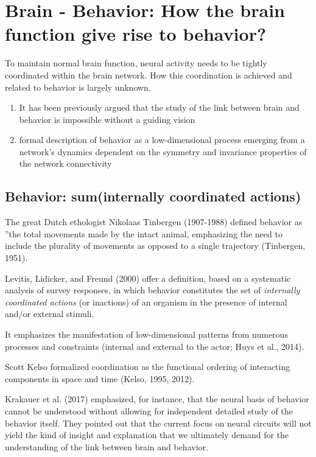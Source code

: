 \chapter{Brain - Behavior: How the brain function give rise to behavior?}

To maintain normal brain function, neural activity needs to be tightly
coordinated within the brain network. How this coordination is achieved and
related to behavior is largely unknown.

\begin{enumerate}
  \item It has been previously argued
that the study of the link between brain and behavior is impossible without a guiding vision

  \item formal description of behavior as a low-dimensional process emerging
  from a network's dynamics dependent on the symmetry and invariance properties
  of the network connectivity


\end{enumerate}

\section{Behavior: sum(internally coordinated actions)}

The great Dutch ethologist Nikolaas Tinbergen (1907-1988) defined behavior as
''the total movements made by the intact animal, emphasizing the need to include
the plurality of movements as opposed to a single trajectory (Tinbergen, 1951).


Levitis, Lidicker, and Freund (2000) offer a definition, based on a systematic
analysis of survey responses, in which behavior constitutes the set of {\it
internally coordinated actions} (or inactions) of an organism in the presence of
internal and/or external stimuli.

It emphasizes the manifestation of low-dimensional patterns from numerous
processes and constraints (internal and external to the actor; Huys et al.,
2014).

Scott Kelso formalized coordination as the functional ordering of interacting
components in space and time (Kelso, 1995, 2012).

Krakauer et al. (2017) emphasized, for instance, that the neural basis of
behavior cannot be understood without allowing for independent detailed study of
the behavior itself.
They pointed out that the current focus on neural circuits will not yield the
kind of insight and explanation that we ultimately demand for the understanding
of the link between brain and behavior.

